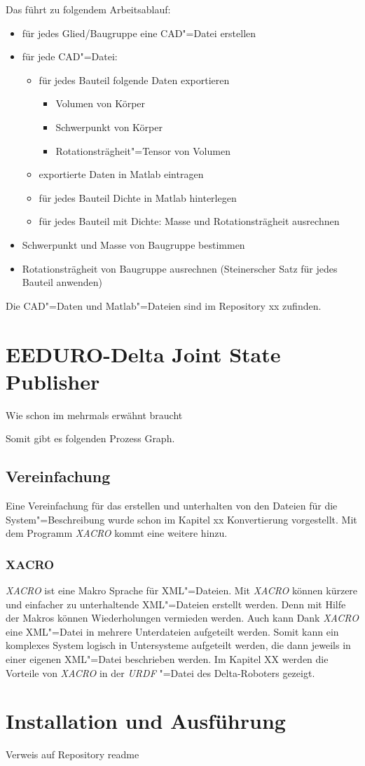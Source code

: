 Das führt zu folgendem Arbeitsablauf:
\begin{itemize}
\item für jedes Glied/Baugruppe eine CAD"=Datei erstellen
\item für jede CAD"=Datei:
\begin{itemize}
\item für jedes Bauteil folgende Daten exportieren
\begin{itemize}
\item Volumen von Körper
\item Schwerpunkt von Körper
\item Rotationsträgheit"=Tensor von Volumen
\end{itemize}
\item exportierte Daten in Matlab eintragen
\item für jedes Bauteil Dichte in Matlab hinterlegen
\item für jedes Bauteil mit Dichte: Masse und Rotationsträgheit ausrechnen  
\end{itemize}
\item Schwerpunkt und Masse von Baugruppe bestimmen
\item Rotationsträgheit von Baugruppe ausrechnen (Steinerscher Satz für jedes Bauteil anwenden)
\end{itemize}

Die CAD"=Daten und Matlab"=Dateien sind im Repository xx zufinden.


\section{EEDURO-Delta Joint State Publisher}
Wie schon im mehrmals erwähnt braucht %




Somit gibt es folgenden Prozess Graph.



\subsection{Vereinfachung}
Eine Vereinfachung für das erstellen und unterhalten von den Dateien für die System"=Beschreibung wurde schon im Kapitel xx Konvertierung vorgestellt. %
Mit dem Programm \textit{XACRO} kommt eine weitere hinzu. 

\subsubsection{XACRO} %
\textit{XACRO} ist eine Makro Sprache für XML"=Dateien. %
Mit \textit{XACRO} können kürzere und einfacher zu unterhaltende XML"=Dateien erstellt werden.
Denn mit Hilfe der Makros können Wiederholungen vermieden werden.
Auch kann Dank \textit{XACRO} eine XML"=Datei in mehrere Unterdateien aufgeteilt werden.
Somit kann ein komplexes System logisch in Untersysteme aufgeteilt werden, die dann jeweils in einer eigenen XML"=Datei beschrieben werden. 
Im Kapitel XX werden die Vorteile von \textit{XACRO} in der \textit{URDF} "=Datei des Delta-Roboters gezeigt.


\section{Installation und Ausführung}
Verweis auf Repository readme